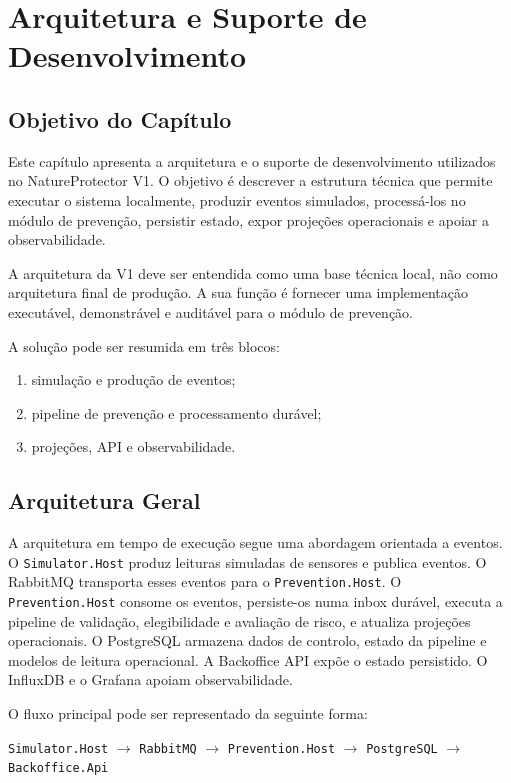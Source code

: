 \chapter{Arquitetura e Suporte de Desenvolvimento}

\section{Objetivo do Capítulo}

Este capítulo apresenta a arquitetura e o suporte de desenvolvimento utilizados no NatureProtector V1. O objetivo é descrever a estrutura técnica que permite executar o sistema localmente, produzir eventos simulados, processá-los no módulo de prevenção, persistir estado, expor projeções operacionais e apoiar a observabilidade.

A arquitetura da V1 deve ser entendida como uma base técnica local, não como arquitetura final de produção. A sua função é fornecer uma implementação executável, demonstrável e auditável para o módulo de prevenção.

A solução pode ser resumida em três blocos:

\begin{enumerate}
    \item simulação e produção de eventos;
    \item pipeline de prevenção e processamento durável;
    \item projeções, API e observabilidade.
\end{enumerate}

\section{Arquitetura Geral}

A arquitetura em tempo de execução segue uma abordagem orientada a eventos. O \texttt{Simulator.Host} produz leituras simuladas de sensores e publica eventos. O RabbitMQ transporta esses eventos para o \texttt{Prevention.Host}. O \texttt{Prevention.Host} consome os eventos, persiste-os numa inbox durável, executa a pipeline de validação, elegibilidade e avaliação de risco, e atualiza projeções operacionais. O PostgreSQL armazena dados de controlo, estado da pipeline e modelos de leitura operacional. A Backoffice API expõe o estado persistido. O InfluxDB e o Grafana apoiam observabilidade.

O fluxo principal pode ser representado da seguinte forma:

\begin{center}
\texttt{Simulator.Host} $\rightarrow$ \texttt{RabbitMQ} $\rightarrow$ \texttt{Prevention.Host} $\rightarrow$ \texttt{PostgreSQL} $\rightarrow$ \texttt{Backoffice.Api}
\end{center}


